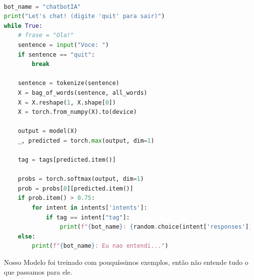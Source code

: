 \begin{lstlisting}[language=Python, caption=Chatbot]

bot_name = "chatbotIA"
print("Let's chat! (digite 'quit' para sair)")
while True:
    # frase = "Ola!"
    sentence = input("Voce: ")
    if sentence == "quit":
        break

    sentence = tokenize(sentence)
    X = bag_of_words(sentence, all_words)
    X = X.reshape(1, X.shape[0])
    X = torch.from_numpy(X).to(device)

    output = model(X)
    _, predicted = torch.max(output, dim=1)

    tag = tags[predicted.item()]

    probs = torch.softmax(output, dim=1)
    prob = probs[0][predicted.item()]
    if prob.item() > 0.75:
        for intent in intents['intents']:
            if tag == intent["tag"]:
                print(f"{bot_name}: {random.choice(intent['responses'])}")
    else:
        print(f"{bot_name}: Eu nao entendi...")


\end{lstlisting}

Nosso Modelo foi treinado com pouquíssimos exemplos, então não entende tudo o que passamos para ele.
